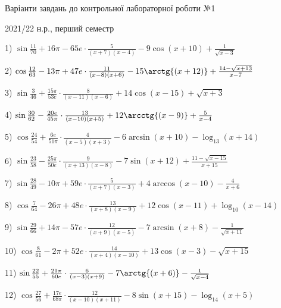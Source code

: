 \documentclass[11pt,ukrainian]{article}
\begin{document}
{\Large \center  Варіанти завдань до контрольної лабораторної роботи №1\par 2021/22 н.р., перший семестр\par \bigskip}
1) \space 
{ ${\sin\frac{11}{70}} + 16{\pi} - 65 e\cdot {\frac{5}{(x + 7)(x - 4)}} - {9\cos{(x + 10)}} + {\frac{1}{\sqrt{x - 3}}}$}
\smallskip\par
2) \space 
{ ${\cos\frac{12}{63}} - 13{\pi} + 47 e\cdot {\frac{11}{(x - 8)(x + 6)}} - {15\arctg{(x + 12)}} + {\frac{14 - \sqrt{x + 13}}{x - 7}}$}
\smallskip\par
3) \space 
{ ${\sin\frac{3}{46}} + \frac{15{\pi}}{53 e}\cdot {\frac{8}{(x - 11)(x - 6)}} + {14\cos{(x - 15)}} + {\sqrt{x + 3}}$}
\smallskip\par
4) \space 
{ ${\sin\frac{30}{62}} - \frac{20 e}{45{\pi}}\cdot {\frac{13}{(x - 10)(x + 5)}} + {12\arcctg{(x - 9)}} + { \frac{5}{x - 4}}$}
\smallskip\par
5) \space 
{ ${\cos\frac{24}{54}} + \frac{6 e}{51{\pi}}\cdot {\frac{4}{(x - 5)(x + 3)}} - {6\arcsin{(x + 10)}} - {\log_{13}(x + 14)}$}
\smallskip\par
6) \space 
{ ${\sin\frac{23}{58}} - \frac{25{\pi}}{50 e}\cdot {\frac{9}{(x + 13)(x - 8)}} - {7\sin{(x + 12)}} + {\frac{11 - \sqrt{x - 15}}{x + 15}}$}
\smallskip\par
7) \space 
{ ${\sin\frac{28}{49}} - 10{\pi} + 59 e\cdot {\frac{5}{(x + 7)(x - 3)}} + {4\arccos{(x - 10)}} - { \frac{4}{x + 6}}$}
\smallskip\par
8) \space 
{ ${\cos\frac{7}{64}} - 26{\pi} + 48 e\cdot {\frac{13}{(x + 8)(x - 9)}} + {12\cos{(x - 11)}} + {\log_{10}(x - 14)}$}
\smallskip\par
9) \space 
{ ${\sin\frac{29}{66}} + 14{\pi} - 57 e\cdot {\frac{12}{(x + 9)(x - 5)}} - {7\arcsin{(x + 8)}} - {\frac{1}{\sqrt{x + 11}}}$}
\smallskip\par
10) \space 
{ ${\cos\frac{8}{61}} - 2{\pi} + 52 e\cdot {\frac{14}{(x + 4)(x - 10)}} + {13\cos{(x - 3)}} - {\sqrt{x + 15}}$}
\smallskip\par
11) \space 
{ ${\sin\frac{22}{55}} + \frac{21{\pi}}{60 e}\cdot {\frac{6}{(x - 3)(x + 9)}} - {7\arctg{(x + 6)}} - {\frac{1}{\sqrt{x - 4}}}$}
\smallskip\par
12) \space 
{ ${\cos\frac{27}{56}} + \frac{17 e}{68{\pi}}\cdot {\frac{12}{(x - 10)(x + 11)}} - {8\sin{(x + 15)}} - {\log_{14}(x + 5)}$}
\smallskip\par
\end{document}
